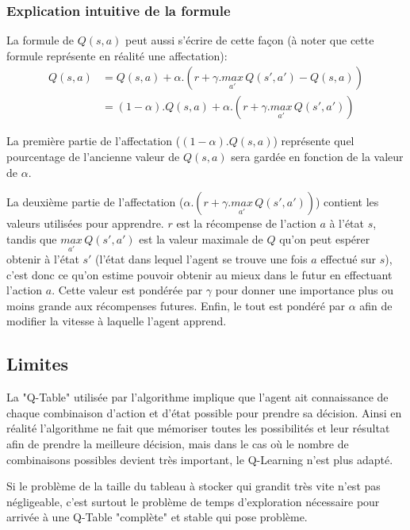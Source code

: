 \subsubsection{Explication intuitive de la formule}
La formule de $Q(s,a)$ peut aussi s'écrire de cette façon (à noter que cette formule représente en réalité une affectation):
\begin{equation*}
\begin{aligned}
    Q(s,a) &= Q(s,a) + \alpha . \left( r + \gamma . \underset{a'}{max}\, Q(s',a') - Q(s,a) \right) \\
    & = (1 - \alpha) . Q(s,a) + \alpha . \left( r + \gamma . \underset{a'}{max}\, Q(s',a') \right)
\end{aligned}
\end{equation*}

La première partie de l'affectation ($(1 - \alpha) . Q(s,a)$) représente quel pourcentage de l'ancienne valeur de $Q(s,a)$ sera gardée en fonction de la valeur de $\alpha$. \par
La deuxième partie de l'affectation ($\alpha . \left( r + \gamma . \underset{a'}{max}\, Q(s',a') \right)$) contient les valeurs utilisées pour apprendre. $r$ est la récompense de l'action $a$ à l'état $s$, tandis que $\underset{a'}{max}\, Q(s',a')$ est la valeur maximale de $Q$ qu'on peut espérer obtenir à l'état $s'$ (l'état dans lequel l'agent se trouve une fois $a$ effectué sur $s$), c'est donc ce qu'on estime pouvoir obtenir au mieux dans le futur en effectuant l'action $a$. Cette valeur est pondérée par $\gamma$ pour donner une importance plus ou moins grande aux récompenses futures. Enfin, le tout est pondéré par $\alpha$ afin de modifier la vitesse à laquelle l'agent apprend.


\subsection{Limites}
La "Q-Table" utilisée par l'algorithme implique que l'agent ait connaissance de chaque combinaison d'action et d'état possible pour prendre sa décision. Ainsi en réalité l'algorithme ne fait que mémoriser toutes les possibilités et leur résultat afin de prendre la meilleure décision, mais dans le cas où le nombre de combinaisons possibles devient très important, le Q-Learning n'est plus adapté. \par
Si le problème de la taille du tableau à stocker qui grandit très vite n'est pas négligeable, c'est surtout le problème de temps d'exploration nécessaire pour arrivée à une Q-Table "complète" et stable qui pose problème.

